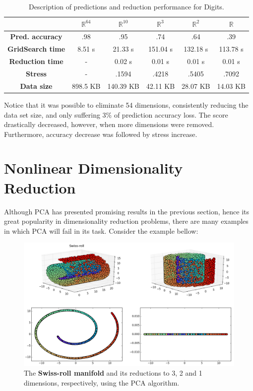 \documentclass[12pt]{report}
\begin{document}
\begin{table}[H]
	\centering
	\begin{tabular}{|c|c|c|c|c|c|}
		\hline
		& \textbf{$\mathbb{R}^{64}$} & \textbf{$\mathbb{R}^{10}$} & \textbf{$\mathbb{R}^3$} & \textbf{$\mathbb{R}^2$} & \textbf{$\mathbb{R}$} \\\hline
		\textbf{Pred. accuracy}   & .98 & .95 & .74 & .64 & .39 \\\hline
		\textbf{GridSearch time} & 8.51 s & 21.33 s & 151.04 s & 132.18 s & 113.78 s \\\hline
		\textbf{Reduction time} & - & 0.02 s & 0.01 s & 0.01 s & 0.01 s \\\hline
		\textbf{Stress} & - & .1594 & .4218 & .5405 & .7092 \\\hline
		\textbf{Data size} & 898.5 KB & 140.39 KB & 42.11 KB & 28.07 KB & 14.03 KB \\\hline
	\end{tabular}

	\caption{Description of predictions and reduction performance for Digits.}
\end{table}

Notice that it was possible to eliminate 54 dimensions, consistently reducing the data set size, and only suffering 3\% of prediction accuracy loss. The score drastically decreased, however, when more dimensions were removed. Furthermore, accuracy decrease was followed by stress increase.

\newpage
\chapter{Nonlinear Dimensionality Reduction}

Although PCA has presented promising results in the previous section, hence its great popularity in dimensionality reduction problems, there are many examples in which PCA will fail in its task. Consider the example bellow:

\begin{figure}[H]
	\centering
	\captionsetup{justification=centering}

	\includegraphics[width=\linewidth]{experiments/pca_swiss}
	\caption{The \textbf{Swiss-roll manifold} and its reductions to 3, 2 and 1 dimensions, respectively, using the PCA algorithm.}
	\label{fig:swiss_pca}
\end{figure}
\end{document}
